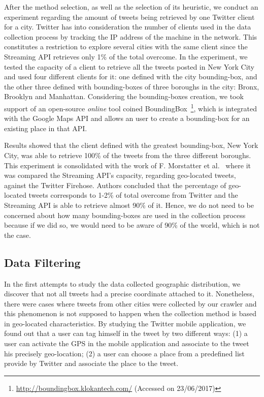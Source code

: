 After the method selection, as well as the selection of its heuristic, we conduct an experiment regarding the amount of tweets being retrieved by one Twitter client for a city. Twitter has into consideration the number of clients used in the data collection process by tracking the IP address of the machine in the network. This constitutes a restriction to explore several cities with the same client since the Streaming API retrieves only 1\% of the total overcome. In the experiment, we tested the capacity of a client to retrieve all the tweets posted in New York City and used four different clients for it: one defined with the city bounding-box, and the other three defined with bounding-boxes of three boroughs in the city: Bronx, Brooklyn and Manhattan. Considering the bounding-boxes creation, we took support of an open-source \textit{online} tool coined BoundingBox~\footnote{\url{http://boundingbox.klokantech.com/} (Accessed on 23/06/2017)}, which is integrated with the Google Maps API and allows an user to create a bounding-box for an existing place in that API.

Results showed that the client defined with the greatest bounding-box, New York City, was able to retrieve 100\% of the tweets from the three different boroughs. This experiment is consolidated with the work of F. Morstatter et al.~\cite{morstatter2013sample} where it was compared the Streaming API's capacity, regarding geo-located tweets, against the Twitter Firehose. Authors concluded that the percentage of geo-located tweets corresponds to 1-2\% of total overcome from Twitter and the Streaming API is able to retrieve almost 90\% of it. Hence, we do not need to be concerned about how many bounding-boxes are used in the collection process because if we did so, we would need to be aware of 90\% of the world, which is not the case.

\subsection{Data Filtering}
\label{subsec:data_filtering}
In the first attempts to study the data collected geographic distribution, we discover that not all tweets had a precise coordinate attached to it. Nonetheless, there were cases where tweets from other cities were collected by our crawler and this phenomenon is not supposed to happen when the collection method is based in geo-located characteristics. By studying the Twitter mobile application, we found out that a user can tag himself in the tweet by two different ways: (1) a user can activate the GPS in the mobile application and associate to the tweet his precisely geo-location; (2) a user can choose a place from a predefined list provide by Twitter and associate the place to the tweet.

